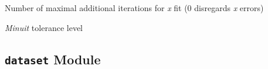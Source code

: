 \documentclass[a4paper,10pt,english]{sphinxmanual}
\begin{document}

\begin{fulllineitems}
\label{index:kafe.constants.M_MAX_X_FIT_ITERATIONS}
Number of maximal additional iterations for \emph{x} fit (0 disregards \emph{x} errors)

\end{fulllineitems}


\begin{fulllineitems}
\label{index:kafe.constants.M_TOLERANCE}
\emph{Minuit} tolerance level

\end{fulllineitems}



\subsection{\texttt{dataset} Module}
\label{index:dataset-module}\label{index:module-kafe.dataset}\label{index:module-dataset}
\end{document}
